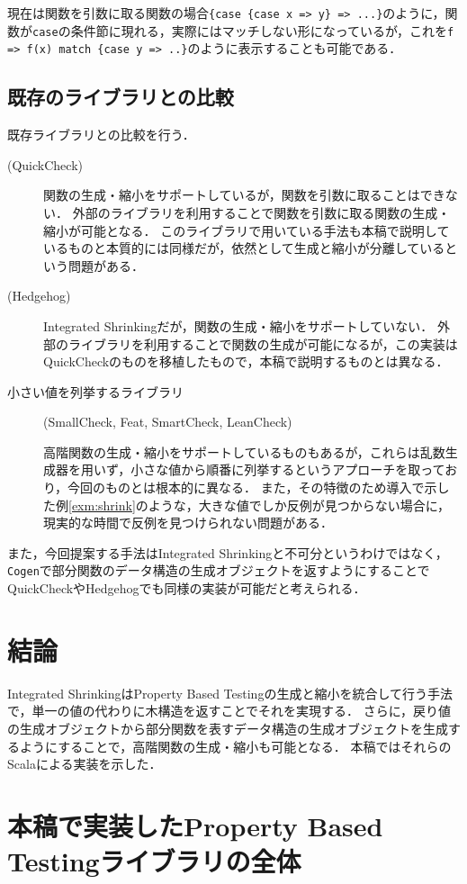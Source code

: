 \documentclass[submit,PRO]{ipsj}
\theoremstyle{definition}
\begin{document}
現在は関数を引数に取る関数の場合\texttt{\{case \{case x => y\} => ...\}}のように，関数が\texttt{case}の条件節に現れる，実際にはマッチしない形になっているが，これを\texttt{f => f(x) match \{case y => ..\}}のように表示することも可能である．

\subsection{既存のライブラリとの比較}

既存ライブラリとの比較を行う．

\begin{description}
  \item[(QuickCheck\cite{claessen_quickcheck_2011})]
    関数の生成・縮小をサポートしているが，関数を引数に取ることはできない．
    外部のライブラリ\cite{quickcheck-higherorder_online}を利用することで関数を引数に取る関数の生成・縮小が可能となる．
    このライブラリで用いている手法も本稿で説明しているものと本質的には同様だが，依然として生成と縮小が分離しているという問題がある．
  \item[(Hedgehog\cite{hedgehog_online})]
    Integrated Shrinkingだが，関数の生成・縮小をサポートしていない．
    外部のライブラリ\cite{hedgehog-fn_online}を利用することで関数の生成が可能になるが，この実装はQuickCheckのものを移植したもので，本稿で説明するものとは異なる．
  \item[小さい値を列挙するライブラリ]
    (SmallCheck\cite{runciman_smallcheck_2008}, Feat\cite{duregaard_feat_2012}, SmartCheck\cite{pike_smartcheck_2014}, LeanCheck\cite{matela_braquehais_tools_2017})

    高階関数の生成・縮小をサポートしているものもあるが，これらは乱数生成器を用いず，小さな値から順番に列挙するというアプローチを取っており，今回のものとは根本的に異なる．
    また，その特徴のため導入で示した例\ref{exm:shrink}のような，大きな値でしか反例が見つからない場合に，現実的な時間で反例を見つけられない問題がある．
\end{description}

また，今回提案する手法はIntegrated Shrinkingと不可分というわけではなく，\texttt{Cogen}で部分関数のデータ構造の生成オブジェクトを返すようにすることでQuickCheckやHedgehogでも同様の実装が可能だと考えられる．

\section{結論}

Integrated ShrinkingはProperty Based Testingの生成と縮小を統合して行う手法で，単一の値の代わりに木構造を返すことでそれを実現する．
さらに，戻り値の生成オブジェクトから部分関数を表すデータ構造の生成オブジェクトを生成するようにすることで，高階関数の生成・縮小も可能となる．
本稿ではそれらのScalaによる実装を示した．




\onecolumn\appendix

\section{本稿で実装したProperty Based Testingライブラリの全体}\label{sec:appndix-1}

\inputminted[autogobble,breaklines,linenos,fontsize=\scriptsize]{scala}{../src/main/scala/minicheck.scala}
\end{document}

